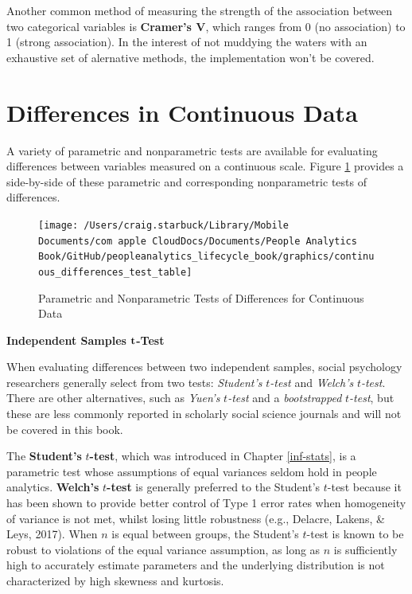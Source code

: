 \documentclass[]{book}
\begin{document}
Another common method of measuring the strength of the association between two categorical variables is \textbf{Cramer's V}, which ranges from 0 (no association) to 1 (strong association). In the interest of not muddying the waters with an exhaustive set of alernative methods, the implementation won't be covered.

\hypertarget{differences-in-continuous-data}{%
\section{Differences in Continuous Data}\label{differences-in-continuous-data}}

A variety of parametric and nonparametric tests are available for evaluating differences between variables measured on a continuous scale. Figure \ref{fig:continuous-tests} provides a side-by-side of these parametric and corresponding nonparametric tests of differences.

\begin{figure}

{\centering \texttt{[image: /Users/craig.starbuck/Library/Mobile Documents/com~apple~CloudDocs/Documents/People Analytics Book/GitHub/peopleanalytics\_lifecycle\_book/graphics/continuous\_differences\_test\_table]} 

}

\caption{Parametric and Nonparametric Tests of Differences for Continuous Data}\label{fig:continuous-tests}
\end{figure}

\textbf{Independent Samples }\(\textbf t\)\textbf{-Test}

When evaluating differences between two independent samples, social psychology researchers generally select from two tests: \emph{Student's} \(t\)\emph{-test} and \emph{Welch's} \(t\)\emph{-test}. There are other alternatives, such as \emph{Yuen's} \(t\)\emph{-test} and a \emph{bootstrapped} \(t\)\emph{-test}, but these are less commonly reported in scholarly social science journals and will not be covered in this book.

The \textbf{Student's} \(t\)\textbf{-test}, which was introduced in Chapter \ref{inf-stats}, is a parametric test whose assumptions of equal variances seldom hold in people analytics. \textbf{Welch's} \(t\)\textbf{-test} is generally preferred to the Student's \(t\)-test because it has been shown to provide better control of Type 1 error rates when homogeneity of variance is not met, whilst losing little robustness (e.g., Delacre, Lakens, \& Leys, 2017). When \(n\) is equal between groups, the Student's \(t\)-test is known to be robust to violations of the equal variance assumption, as long as \(n\) is sufficiently high to accurately estimate parameters and the underlying distribution is not characterized by high skewness and kurtosis.
\end{document}
